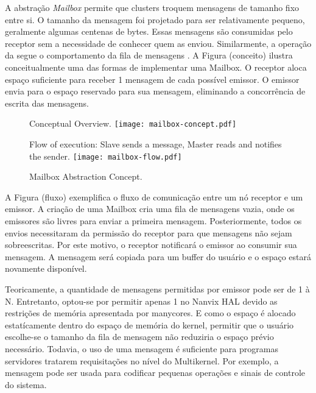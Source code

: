 			A abstração \textit{Mailbox} permite que clusters troquem mensagens
			de tamanho fixo entre si.
			O tamanho da mensagem foi projetado para ser relativamente pequeno,
			geralmente algumas centenas de bytes.
			Essas mensagens são consumidas pelo receptor sem a necessidade de conhecer quem as enviou.
			Similarmente, a operação da \mailbox segue o comportamento da fila de mensagens \posix.
			A Figura (conceito) ilustra conceitualmente uma das formas de implementar uma Mailbox.
			O receptor aloca espaço suficiente para receber 1 mensagem de cada possível emissor.
			O emissor envia para o espaço reservado para sua mensagem, eliminando a concorrência de escrita das mensagens.

			\begin{figure}[!tb]
				\centering%
				\caption{Mailbox Abstraction Concept.}%
				\label{fig:mailbox}%

					{Conceptual Overview.}%
					{\texttt{[image: mailbox-concept.pdf]}}%

				\hfill

					{Flow of execution: Slave sends a message, Master reads and notifies the sender.}%
					{\texttt{[image: mailbox-flow.pdf]}}%

			\end{figure}

			A Figura (fluxo) exemplifica o fluxo de comunicação entre um nó receptor e um emissor.
			A criação de uma Mailbox cria uma fila de mensagens vazia, onde os emissores são livres para enviar a primeira mensagem.
			Posteriormente, todos os envios necessitaram da permissão do receptor para que mensagens não sejam sobreescritas.
			Por este motivo, o receptor notificará o emissor ao consumir sua mensagem.
			A mensagem será copiada para um buffer do usuário e o espaço estará novamente disponível.

			Teoricamente, a quantidade de mensagens permitidas por emissor pode ser de 1 à N.
			Entretanto, optou-se por permitir apenas 1 no Nanvix HAL devido as restrições de memória apresentada por manycores.
			E como o espaço é alocado estatícamente dentro do espaço de memória do kernel, permitir que o usuário escolhe-se o tamanho da fila de mensagem não reduziria o espaço prévio necessário.
			Todavia, o uso de uma mensagem é suficiente para programas servidores tratarem requisitações no nível do Multikernel.
			Por exemplo, a mensagem pode ser usada para codificar pequenas operações e sinais de controle do sistema.

